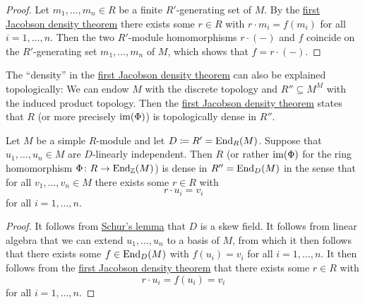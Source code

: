 \begin{proof}
  Let $m_1, \dotsc, m_n \in R$ be a finite $R'$-generating set of $M$.
  By the \hyperref[theorem: first jacobson density theorem]{first Jacobson density theorem} there exists some $r \in R$ with $r \cdot m_i = f(m_i)$ for all $i = 1, \dotsc, n$.
  Then the two $R'$-module homomorphisms $r \cdot (-)$ and $f$ coincide on the $R'$-generating set $m_1, \dotsc, m_n$ of $M$, which shows that $f = r \cdot (-)$.
\end{proof}


\begin{remark}
  The \enquote{density} in the \hyperref[theorem: first jacobson density theorem]{first Jacobson density theorem} can also be explained topologically:
  We can endow $M$ with the discrete topology and $R'' \subseteq M^M$ with the induced product topology.
  Then the \hyperref[theorem: first jacobson density theorem]{first Jacobson density theorem} states that $R$ (or more precisely $\operatorname{im}(\Phi)$) is topologically dense in $R''$.
\end{remark}


\begin{theorem}
  Let $M$ be a simple $R$-module and let $D \coloneqq R' = \operatorname{End}_R(M)$.
  Suppose that $u_1, \dotsc, u_n \in M$ are $D$-linearly independent.
  Then $R$ (or rather $\operatorname{im}(\Phi)$ for the ring homomorphism $\Phi \colon R \to \operatorname{End}_{\mathbb{Z}}(M)$) is dense in $R'' = \operatorname{End}_D(M)$ in the sense that for all $v_1, \dotsc, v_n \in M$ there exists some $r \in R$ with
  \[
    r \cdot u_i = v_i
  \]
  for all $i = 1, \dotsc, n$.
\end{theorem}


\begin{proof}
  It follows from \hyperref[proposition: schurs lemma for modules]{Schur’s lemma} that $D$ is a skew field.
  It follows from linear algebra that we can extend $u_1, \dotsc, u_n$ to a basis of $M$, from which it then follows that there exists some $f \in \operatorname{End}_D(M)$ with $f(u_i) = v_i$ for all $i = 1, \dotsc, n$.
  It then follows from the \hyperref[theorem: first jacobson density theorem]{first Jacobson density theorem} that there exists some $r \in R$ with
  \[
      r \cdot u_i
    = f(u_i)
    = v_i
  \]
  for all $i = 1, \dotsc, n$.
\end{proof}



